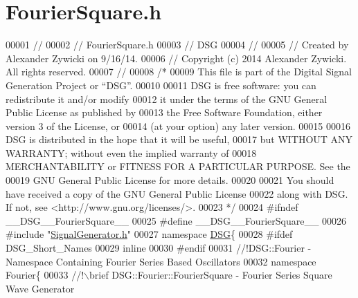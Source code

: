 \hypertarget{_fourier_square_8h_source}{\section{Fourier\+Square.\+h}
\label{_fourier_square_8h_source}
}

\begin{DoxyCode}
00001 \textcolor{comment}{//}
00002 \textcolor{comment}{//  FourierSquare.h}
00003 \textcolor{comment}{//  DSG}
00004 \textcolor{comment}{//}
00005 \textcolor{comment}{//  Created by Alexander Zywicki on 9/16/14.}
00006 \textcolor{comment}{//  Copyright (c) 2014 Alexander Zywicki. All rights reserved.}
00007 \textcolor{comment}{//}
00008 \textcolor{comment}{/*}
00009 \textcolor{comment}{ This file is part of the Digital Signal Generation Project or “DSG”.}
00010 \textcolor{comment}{}
00011 \textcolor{comment}{ DSG is free software: you can redistribute it and/or modify}
00012 \textcolor{comment}{ it under the terms of the GNU General Public License as published by}
00013 \textcolor{comment}{ the Free Software Foundation, either version 3 of the License, or}
00014 \textcolor{comment}{ (at your option) any later version.}
00015 \textcolor{comment}{}
00016 \textcolor{comment}{ DSG is distributed in the hope that it will be useful,}
00017 \textcolor{comment}{ but WITHOUT ANY WARRANTY; without even the implied warranty of}
00018 \textcolor{comment}{ MERCHANTABILITY or FITNESS FOR A PARTICULAR PURPOSE.  See the}
00019 \textcolor{comment}{ GNU General Public License for more details.}
00020 \textcolor{comment}{}
00021 \textcolor{comment}{ You should have received a copy of the GNU General Public License}
00022 \textcolor{comment}{ along with DSG.  If not, see <http://www.gnu.org/licenses/>.}
00023 \textcolor{comment}{ */}
00024 \textcolor{preprocessor}{#ifndef \_\_DSG\_\_FourierSquare\_\_}
00025 \textcolor{preprocessor}{#define \_\_DSG\_\_FourierSquare\_\_}
00026 \textcolor{preprocessor}{#include "\hyperlink{_signal_generator_8h}{SignalGenerator.h}"}
00027 \textcolor{keyword}{namespace }\hyperlink{namespace_d_s_g}{DSG}\{
00028 \textcolor{preprocessor}{#ifdef DSG\_Short\_Names}
00029     \textcolor{keyword}{inline}
00030 \textcolor{preprocessor}{#endif}
00031 \textcolor{comment}{    //!DSG::Fourier - Namespace Containing Fourier Series Based Oscillators}
00032 \textcolor{comment}{}    \textcolor{keyword}{namespace }Fourier\{\textcolor{comment}{}
00033 \textcolor{comment}{        //!\(\backslash\)brief DSG::Fourier::FourierSquare - Fourier Series Square Wave Generator}

\end{DoxyCode}
